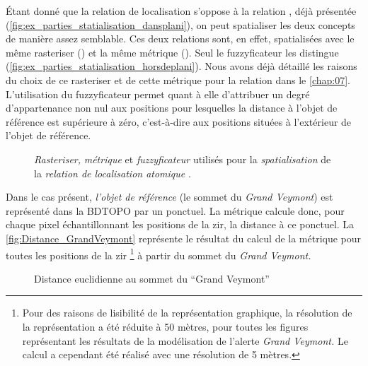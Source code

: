 Étant donné que la relation de localisation
 s'oppose à la relation
, déjà présentée
(\autoref{fig:ex_parties_statialisation_dansplani}), on peut
spatialiser les deux concepts de manière assez semblable. Ces deux
relations sont, en effet, spatialisées avec le même rasteriser
() et la même métrique ().
Seul le fuzzyficateur les distingue
(\autoref{fig:ex_parties_statialisation_horsdeplani}). Nous avons déjà
détaillé les raisons du choix de ce rasteriser et de cette métrique
pour la relation  dans le
\autoref{chap:07}. L'utilisation du fuzzyficateur
 permet quant à elle d'attribuer un degré
d'appartenance non nul aux positions pour lesquelles la distance à
l'objet de référence est supérieure à zéro, c'est-à-dire aux positions
situées à l'extérieur de l'objet de référence.

\begin{figure}
  \centering
  
  \caption{\emph{Rasteriser,} \emph{métrique} et \emph{fuzzyficateur}
    utilisés pour la \emph{spatialisation} de la \emph{relation de
      localisation atomique}
    \protect{}.}
  \label{fig:ex_parties_statialisation_horsdeplani}
\end{figure}

Dans le cas présent, \emph{l'objet de référence} (le sommet du
\emph{Grand Veymont}) est représenté dans la BDTOPO par un
ponctuel. La métrique  calcule donc, pour chaque
pixel échantillonnant les positions de la \ac{zir}, la distance à ce
ponctuel. La \autoref{fig:Distance_GrandVeymont} représente le
résultat du calcul de la métrique  pour toutes
les positions de la \ac{zir} \footnote{Pour des raisons de lisibilité
  de la représentation graphique, la résolution de la représentation a
  été réduite à 50 mètres, pour toutes les figures représentant les
  résultats de la modélisation de l'alerte \emph{Grand Veymont.} Le
  calcul a cependant été réalisé avec une résolution de 5 mètres.} à
partir du sommet du \emph{Grand Veymont.}

\begin{figure}
  \centering
  
  \caption{Distance euclidienne au sommet du \enquote{Grand Veymont}}
  \label{fig:Distance_GrandVeymont}
\end{figure}


